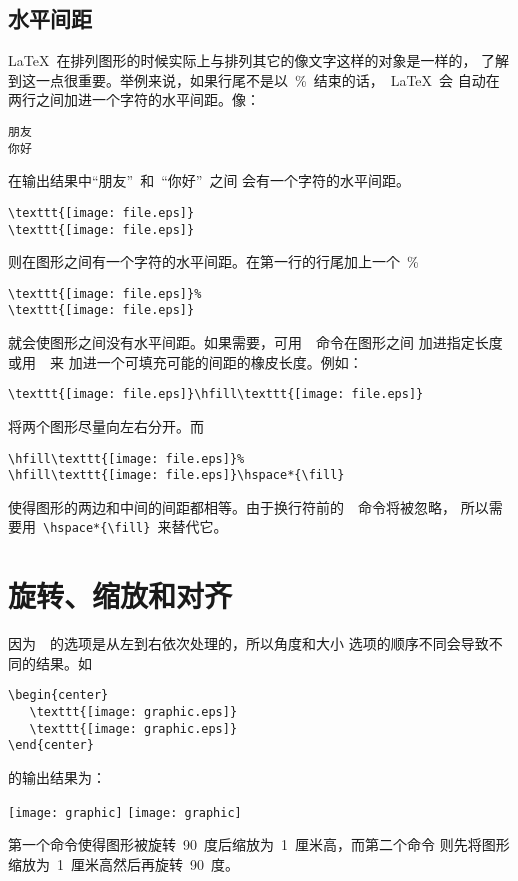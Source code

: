 \subsection{水平间距}\label{ssec:hspace}

\LaTeX{}~在排列图形的时候实际上与排列其它的像文字这样的对象是一样的，
了解到这一点很重要。举例来说，如果行尾不是以~\%~结束的话，~\LaTeX{}~会
自动在两行之间加进一个字符的水平间距。像：
\begin{Verbatim}[xleftmargin=1cm,formatcom=\CJKfamily{kai}\color{VerbatimColor}]
朋友
你好
\end{Verbatim}
在输出结果中``{朋友}''~和~``{你好}''~之间
会有一个字符的水平间距。

\begin{Verbatim}[xleftmargin=1cm]
\texttt{[image: file.eps]}
\texttt{[image: file.eps]}
\end{Verbatim}
则在图形之间有一个字符的水平间距。在第一行的行尾加上一个~\%~
\begin{Verbatim}[xleftmargin=1cm]
\texttt{[image: file.eps]}%
\texttt{[image: file.eps]}
\end{Verbatim}
就会使图形之间没有水平间距。如果需要，可用~~命令在图形之间
加进指定长度或用~~来
加进一个可填充可能的间距的橡皮长度。例如：
\begin{Verbatim}[xleftmargin=1cm]
\texttt{[image: file.eps]}\hfill\texttt{[image: file.eps]}
\end{Verbatim}
将两个图形尽量向左右分开。而
\begin{Verbatim}[xleftmargin=1cm]
\hfill\texttt{[image: file.eps]}%
\hfill\texttt{[image: file.eps]}\hspace*{\fill}
\end{Verbatim}
使得图形的两边和中间的间距都相等。由于换行符前的~~命令将被忽略，
所以需要用~\verb+\hspace*{\fill}+~来替代它。

\section{旋转、缩放和对齐}\label{sec:sralign}

因为~~的选项是从左到右依次处理的，所以角度和大小
选项的顺序不同会导致不同的结果。如
\begin{Verbatim}[xleftmargin=1cm]
\begin{center}
   \texttt{[image: graphic.eps]}
   \texttt{[image: graphic.eps]}
\end{center}
\end{Verbatim}
的输出结果为：
\begin{center}
   \texttt{[image: graphic]}
   \texttt{[image: graphic]}
\end{center}
第一个命令使得图形被旋转~90~度后缩放为~1~厘米高，而第二个命令
则先将图形缩放为~1~厘米高然后再旋转~90~度。


